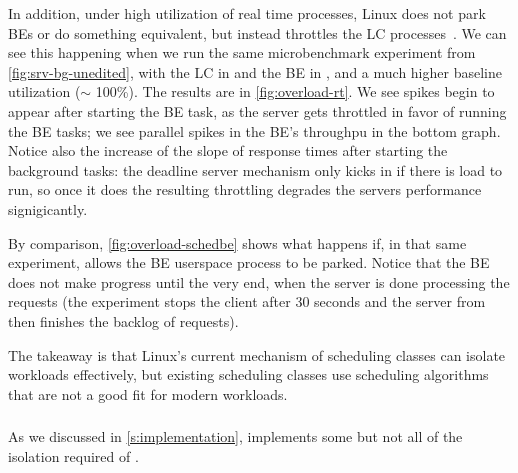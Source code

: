 In addition, under high utilization of real time processes, Linux does not park
BEs or do something equivalent, but instead throttles the \fifoclass{} LC
processes~\cite{lkml-deadline-srv}. We can see this happening when we run the
same microbenchmark experiment from \autoref{fig:srv-bg-unedited}, with the LC
in \fifoclass{} and the BE in \normalclass{}, and a much higher baseline
utilization ($\sim$ 100\%). The results are in \autoref{fig:overload-rt}. We see
spikes begin to appear after starting the BE task, as the \fifoclass{} server
gets throttled in favor of running the BE tasks; we see parallel spikes in the
BE's throughpu in the bottom graph. Notice also the increase of the slope of
response times after starting the background tasks: the deadline server
mechanism only kicks in if there is load to run, so once it does the resulting
throttling degrades the servers performance signigicantly.

By comparison, \autoref{fig:overload-schedbe} shows what happens if, in that
same experiment, \schedbe{} allows the BE userspace process to be parked. Notice
that the BE does not make progress until the very end, when the server is done
processing the requests (the experiment stops the client after 30 seconds and
the server from then finishes the backlog of requests).

The takeaway is that Linux's current mechanism of scheduling classes can isolate
workloads effectively, but existing scheduling classes use scheduling
algorithms that are not a good fit for modern workloads.

\subsubsection{\schedidle}\label{ss:schedidle}

As we discussed in \autoref{s:implementation}, \schedidle{} implements some but
not all of the isolation required of \beclass{}.

